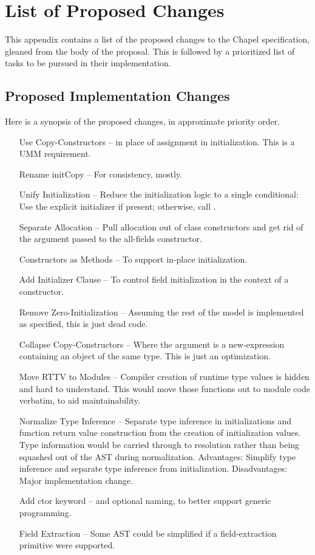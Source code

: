 \section{List of Proposed Changes}
\label{Changes}

This appendix contains a list of the proposed changes to the Chapel specification,
gleaned from the body of the proposal.  This is followed by a prioritized list of tasks to
be pursued in their implementation.

\subsection{Proposed Implementation Changes}

Here is a synopsis of the proposed changes, in approximate priority order.

\begin{itemize}
\item[Use Copy-Constructors] -- in place of assignment in initialization.  This is a UMM requirement.
\item[Rename initCopy] -- For consistency, mostly.
\item[Unify Initialization] -- Reduce the initialization logic to a single conditional:
  Use the explicit initializer if present; otherwise, call .
\item[Separate Allocation] -- Pull allocation out of class constructors and get rid of the
   argument passed to the all-fields constructor.
\item[Constructors as Methods] -- To support in-place initialization.
\item[Add Initializer Clause] -- To control field initialization in the context of a
  constructor.
\item[Remove Zero-Initialization] -- Assuming the rest of the model is implemented as
  specified, this is just dead code.
\item[Collapse Copy-Constructors] -- Where the argument is a new-expression containing
  an object of the same type.  This is just an optimization.
\item[Move RTTV to Modules] -- Compiler creation of runtime type values is hidden and hard
  to understand.  This would move those functions out to module code verbatim, to aid
  maintainability.
\item[Normalize Type Inference] -- Separate type inference in initializations and function
  return value construction from the creation of initialization values.  Type information
  would be carried through to resolution rather than being squashed out of the AST during
  normalization.  Advantages: Simplify type inference and separate type inference from
  initialization.  Disadvantages: Major implementation change.
\item[Add ctor keyword] -- and optional naming, to better support generic
  programming.
\item[Field Extraction] -- Some AST could be simplified if a field-extraction primitive
  were supported.
\end{itemize}

